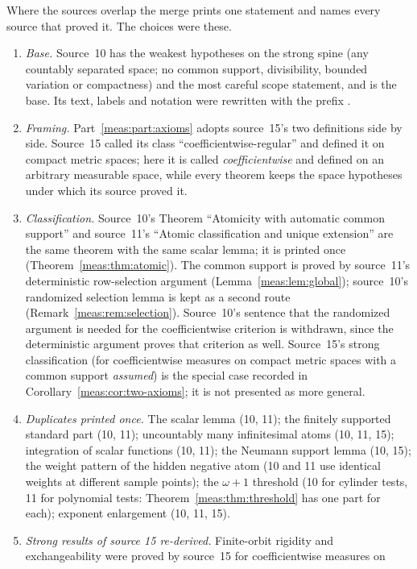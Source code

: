 \documentclass[11pt]{article}
\numberwithin{equation}{section}
\theoremstyle{definition}
\theoremstyle{remark}
\begin{document}
Where the sources overlap the merge prints one statement and names every
source that proved it. The choices were these.
\begin{enumerate}[label=(\arabic*)]
\item \emph{Base.} Source~10 has the weakest hypotheses on the strong spine
(any countably separated space; no common support, divisibility, bounded
variation or compactness) and the most careful scope statement, and is the
base. Its text, labels and notation were rewritten with the prefix
.
\item \emph{Framing.} Part~\ref{meas:part:axioms} adopts source~15's two
definitions side by side. Source~15 called its class
``coefficientwise-regular'' and defined it on compact metric spaces; here it
is called \emph{coefficientwise} and defined on an arbitrary measurable
space, while every theorem keeps the space hypotheses under which its source
proved it.
\item \emph{Classification.} Source~10's Theorem ``Atomicity with automatic
common support'' and source~11's ``Atomic classification and unique
extension'' are the same theorem with the same scalar lemma; it is printed
once (Theorem~\ref{meas:thm:atomic}). The common support is proved by
source~11's deterministic row-selection argument
(Lemma~\ref{meas:lem:global}); source~10's randomized selection lemma is kept
as a second route (Remark~\ref{meas:rem:selection}). Source~10's sentence that
the randomized argument is needed for the coefficientwise criterion is
withdrawn, since the deterministic argument proves that criterion as well.
Source~15's strong classification (for coefficientwise measures on compact
metric spaces with a common support \emph{assumed}) is the special case
recorded in Corollary~\ref{meas:cor:two-axioms}; it is not presented as more
general.
\item \emph{Duplicates printed once.} The scalar lemma (10, 11); the
finitely supported standard part (10, 11); uncountably many infinitesimal atoms
(10, 11, 15); integration of scalar functions (10, 11); the Neumann support
lemma (10, 15); the weight pattern of the hidden negative atom (10 and 11 use
identical weights at different sample points); the $\omega+1$ threshold (10
for cylinder tests, 11 for polynomial tests: Theorem~\ref{meas:thm:threshold}
has one part for each); exponent enlargement (10, 11, 15).
\item \emph{Strong results of source 15 re-derived.} Finite-orbit rigidity and
exchangeability were proved by source~15 for coefficientwise measures on

\end{enumerate}
\end{document}
